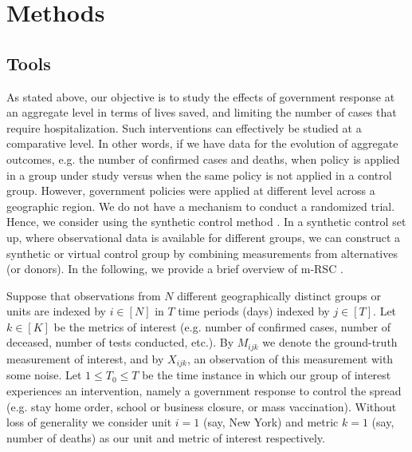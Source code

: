 \documentclass[fleqn,10pt]{wlscirep}
\begin{document}
\section*{Methods}
	\label{SEC2}
		\subsection*{Tools}
	As stated above, our objective is to study the effects of government response at an aggregate level in terms of lives saved, and limiting the number of cases that require hospitalization. Such interventions can effectively be studied at a comparative level. In other words, if we have data for the evolution of aggregate outcomes, e.g. the number of confirmed cases and deaths, when policy is applied in a group under study versus when the same policy is not applied in a control group. However, government policies were applied at different level across a geographic region.  We do not have a mechanism to conduct a randomized trial. Hence, we consider using the synthetic control method \cite{ap08746, JMLR18, AMSS19}. In a synthetic control set up, where observational data is available for different groups, we can construct a synthetic or virtual control group by combining measurements from alternatives (or donors). In the following, we provide a brief overview of m-RSC \cite{AMSS19}.\par
	
	Suppose that observations from $N$ different geographically distinct groups or units are indexed by $i \in [N]$ in $T$ time periods (days) indexed by $j \in [T]$. Let $k \in [K]$ be the metrics of interest (e.g. number of confirmed cases, number of deceased, number of tests conducted, etc.). By $M_{ijk}$ we denote the ground-truth measurement of interest, and by $X_{ijk}$, an observation of this measurement with some noise. Let $1 \leq T_0 \leq T$ be the time instance in which our group of interest experiences an intervention, namely a government response to control the spread (e.g. stay home order, school or business closure, or mass vaccination). Without loss of generality we consider unit $i = 1$ (say, New York) and metric $k = 1$ (say, number of deaths) as our unit and metric of interest respectively.\par
	
\end{document}
